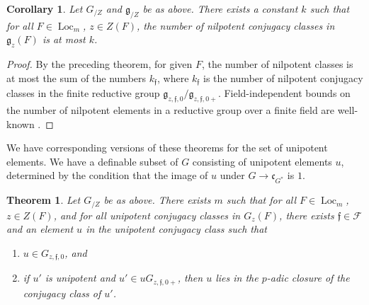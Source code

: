 \documentclass[12pt]{amsart}
\newcommand{\op}[1]{\operatorname{#1}}
\def\s{{\mathfrak{f}}}
\newcommand{\cF}{\mathcal{F}}
\newcommand{\fg}{\mathfrak{g}}
\newcommand{\fc}{\mathfrak{c}}
\theoremstyle{plain}
\newtheorem{theorem}[thm]{Theorem}
\newtheorem{cor}[thm]{Corollary}
\theoremstyle{definition}
\begin{document}
\begin{cor}\label{thm:nilbound}  Let $G_{/Z}$ and $\fg_{/Z}$ be as above.  
There exists a constant $k$ such that for all $F\in \op{Loc}_m$, $z\in
Z(F)$, the number of nilpotent conjugacy classes in $\fg_z(F)$ is at
most $k$.
\end{cor}

\begin{proof} By the preceding theorem, for given $F$, the number of
  nilpotent classes is at most the sum of the numbers $k_\s$, where
  $k_\s$ is the number of nilpotent conjugacy classes in the finite
  reductive group $\fg_{z,\s,0}/\fg_{z,\s,0+}$.  Field-independent
  bounds on the number of nilpotent elements in a reductive
  group over a finite field are well-known \cite{carter1985finite}.
\end{proof}

We have corresponding versions of these theorems for the set of
unipotent elements.  We have a definable subset of $G$ consisting of
unipotent elements $u$, determined by the condition that the image of
$u$ under $G\to \fc_{G^*}$ is $1$.

\begin{theorem} Let $G_{/Z}$ be as above.  There exists
  $m$ such that for all $F\in \op{Loc}_m$, $z\in Z(F)$, and for all unipotent
  conjugacy classes in $G_z(F)$, there exists $\s\in \cF$ and an element
  $u$ in the unipotent conjugacy class such that
\begin{enumerate}
   \item $u\in G_{z,\s,0}$, and
   \item if $u'$ is unipotent and $u'\in u G_{z,\s,0+}$, then $u$
     lies in the $p$-adic closure of the conjugacy class of $u'$.
\end{enumerate}
\end{theorem}
\end{document}
